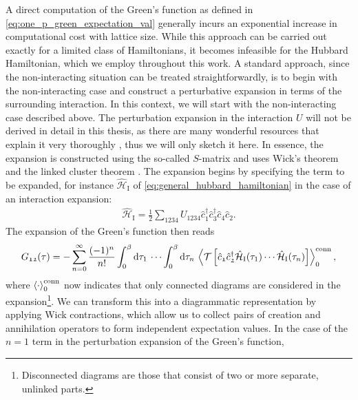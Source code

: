 \documentclass[../../main.tex]{subfiles}
\begin{document}
A direct computation of the Green's function as defined in \eqref{eq:one_p_green_expectation_val} generally incurs an exponential increase in computational cost with lattice size. While this approach can be carried out exactly for a limited class of Hamiltonians, it becomes infeasible for the Hubbard Hamiltonian, which we employ throughout this work. A standard approach, since the non-interacting situation can be treated straightforwardly, is to begin with the non-interacting case and construct a perturbative expansion in terms of the surrounding interaction. In this context, we will start with the non-interacting case described above. The perturbation expansion in the interaction $U$ will not be derived in detail in this thesis, as there are many wonderful resources that explain it very thoroughly \cite{Abrikosov1975, Nolting2009}, thus we will only sketch it here. In essence, the expansion is constructed using the so-called $S$-matrix and uses Wick's theorem \cite{Wick1954, Wick1950, Molinari2023} and the linked cluster theorem \cite{Helias2020}. The expansion begins by specifying the term to be expanded, for instance $\hat{\mathcal{H}}_{\text{I}}$ of \eqref{eq:general_hubbard_hamiltonian} in the case of an interaction expansion:
\begin{align}
	\hat{\mathcal{H}}_{\text{I}} = \frac12 \sum_{\mathfrak{1234}}U_{\mathfrak{1234}}\hat c^{\dagger}_{\mathfrak{1}}\hat c^{\dagger}_{\mathfrak{3}}\hat c_{\mathfrak{4}}\hat c_{\mathfrak{2}}.
\end{align}
The expansion of the Green's function then reads
\begin{align}\label{eq:one_p_green_full_perturbation_exp}
	G_{\mathfrak{12}}(\tau)=-\sum_{n=0}^{\infty}\frac{(-1)^n}{n!}\int_{0}^{\beta}\text{d}\tau_1\,\cdots\int_{0}^{\beta}\text{d}\tau_n\,\left\langle \mathcal{T}\left [\hat{c}_{\mathfrak{1}}\hat{c}^{\dagger}_{\mathfrak{2}}\hat{\mathcal{H}}_{\text{I}}(\tau_1)\cdots \hat{\mathcal{H}}_{\text{I}}(\tau_n) \right ]\right\rangle_0^{\text{conn}},
\end{align}
where $\left\langle \cdot\right\rangle_0^{\text{conn}}$ now indicates that only connected diagrams are considered in the expansion\footnote{Disconnected diagrams are those that consist of two or more separate, unlinked parts.}. We can transform this into a diagrammatic representation by applying Wick contractions, which allow us to collect pairs of creation and annihilation operators to form independent expectation values. In the case of the $n=1$ term in the perturbation expansion of the Green's function,
\end{document}

